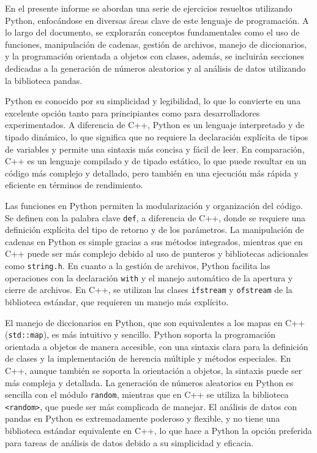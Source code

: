 \documentclass[conference]{IEEEtran}
\begin{document}
En el presente informe se abordan una serie de ejercicios resueltos utilizando Python, enfocándose en diversas áreas clave de este lenguaje de programación. A lo largo del documento, se explorarán conceptos fundamentales como el uso de funciones, manipulación de cadenas, gestión de archivos, manejo de diccionarios, y la programación orientada a objetos con clases, además, se incluirán secciones dedicadas a la generación de números aleatorios y al análisis de datos utilizando la biblioteca pandas.

Python es conocido por su simplicidad y legibilidad, lo que lo convierte en una excelente opción tanto para principiantes como para desarrolladores experimentados. A diferencia de C++, Python es un lenguaje interpretado y de tipado dinámico, lo que significa que no requiere la declaración explícita de tipos de variables y permite una sintaxis más concisa y fácil de leer. En comparación, C++ es un lenguaje compilado y de tipado estático, lo que puede resultar en un código más complejo y detallado, pero también en una ejecución más rápida y eficiente en términos de rendimiento.

Las funciones en Python permiten la modularización y organización del código. Se definen con la palabra clave \texttt{def}, a diferencia de C++, donde se requiere una definición explícita del tipo de retorno y de los parámetros. La manipulación de cadenas en Python es simple gracias a sus métodos integrados, mientras que en C++ puede ser más complejo debido al uso de punteros y bibliotecas adicionales como \texttt{string.h}. En cuanto a la gestión de archivos, Python facilita las operaciones con la declaración \texttt{with} y el manejo automático de la apertura y cierre de archivos. En C++, se utilizan las clases \texttt{ifstream} y \texttt{ofstream} de la biblioteca estándar, que requieren un manejo más explícito.

El manejo de diccionarios en Python, que son equivalentes a los mapas en C++ (\texttt{std::map}), es más intuitivo y sencillo. Python soporta la programación orientada a objetos de manera accesible, con una sintaxis clara para la definición de clases y la implementación de herencia múltiple y métodos especiales. En C++, aunque también se soporta la orientación a objetos, la sintaxis puede ser más compleja y detallada. La generación de números aleatorios en Python es sencilla con el módulo \texttt{random}, mientras que en C++ se utiliza la biblioteca \texttt{<random>}, que puede ser más complicada de manejar. El análisis de datos con pandas en Python es extremadamente poderoso y flexible, y no tiene una biblioteca estándar equivalente en C++, lo que hace a Python la opción preferida para tareas de análisis de datos debido a su simplicidad y eficacia.
\end{document}
